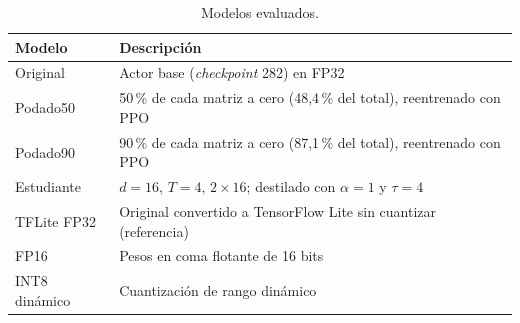 \begin{table}[H]
	\centering
	\small
	\begin{tabular}{p{2.5cm}p{9.0cm}}
		\toprule
		\textbf{Modelo} & \textbf{Descripción} \\
		\midrule
		Original & Actor base (\textit{checkpoint} 282) en FP32 \\
		Podado50 & 50\,\% de cada matriz a cero (48,4\,\% del total), reentrenado con PPO \\
		Podado90 & 90\,\% de cada matriz a cero (87,1\,\% del total), reentrenado con PPO \\
		Estudiante & $d = 16$, $T = 4$, $2 \times 16$; destilado con $\alpha = 1$ y $\tau = 4$ \\
		TFLite FP32 & Original convertido a TensorFlow Lite sin cuantizar (referencia) \\
		FP16 & Pesos en coma flotante de 16 bits \\
		INT8 dinámico & Cuantización de rango dinámico \\
		\bottomrule
	\end{tabular}
	\caption{Modelos evaluados.}
	\label{tab:modelos_evaluados}
\end{table}
